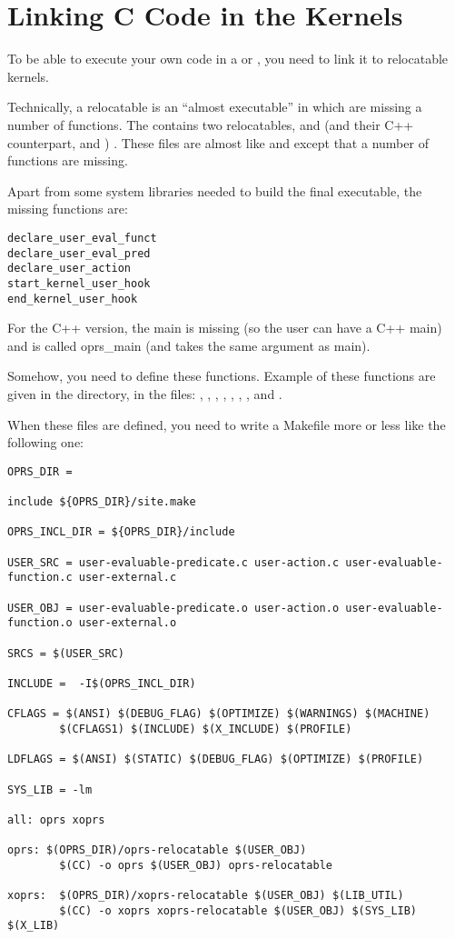 \section{Linking C Code in the Kernels}

To be able to execute your own code in a \CPK{} or \XPK{}, you need to link it
to relocatable kernels.

Technically, a relocatable is an ``almost executable'' in which are missing a
number of functions. The \COPRSDE{} contains two relocatables,
 and  (and their C++ counterpart,
 and ) . These files are
almost like  and  except that a number of functions are
missing.

Apart from some system libraries needed to build the final executable,  the
missing functions are:
\begin{verbatim}
declare_user_eval_funct 
declare_user_eval_pred 
declare_user_action 
start_kernel_user_hook 
end_kernel_user_hook 
\end{verbatim}

For the C++ version, the main is missing (so the user can have a C++ main) and
is called oprs\_main (and takes the same argument as main).

Somehow, you need to define these functions. Example of these functions are
given in the  directory, in the files: , 
, , ,
, , ,
 and .

When  these files are defined, you need to write a Makefile more or less like
the following one:
\begin{verbatim}
OPRS_DIR =

include ${OPRS_DIR}/site.make

OPRS_INCL_DIR = ${OPRS_DIR}/include

USER_SRC = user-evaluable-predicate.c user-action.c user-evaluable-function.c user-external.c

USER_OBJ = user-evaluable-predicate.o user-action.o user-evaluable-function.o user-external.o

SRCS = $(USER_SRC)

INCLUDE =  -I$(OPRS_INCL_DIR)

CFLAGS = $(ANSI) $(DEBUG_FLAG) $(OPTIMIZE) $(WARNINGS) $(MACHINE) 
        $(CFLAGS1) $(INCLUDE) $(X_INCLUDE) $(PROFILE)

LDFLAGS = $(ANSI) $(STATIC) $(DEBUG_FLAG) $(OPTIMIZE) $(PROFILE)

SYS_LIB = -lm

all: oprs xoprs

oprs: $(OPRS_DIR)/oprs-relocatable $(USER_OBJ)
        $(CC) -o oprs $(USER_OBJ) oprs-relocatable 

xoprs:  $(OPRS_DIR)/xoprs-relocatable $(USER_OBJ) $(LIB_UTIL)
        $(CC) -o xoprs xoprs-relocatable $(USER_OBJ) $(SYS_LIB) $(X_LIB)
\end{verbatim}

